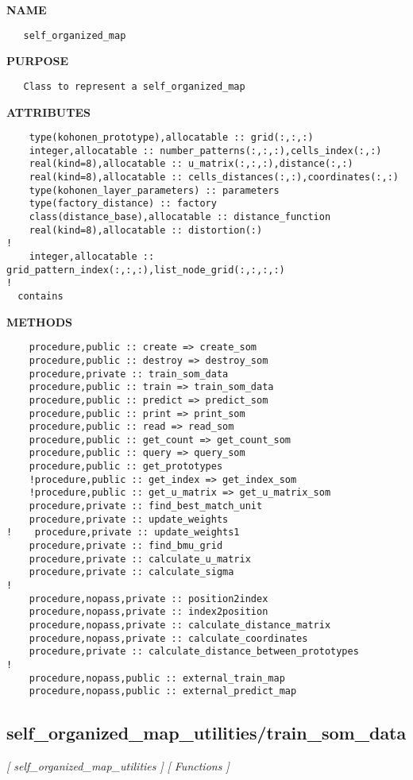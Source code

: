 \documentclass{article}
\begin{document}
\label{ch:robo54}
\label{ch:self_organized_map_utilities_self_organized_map}
\textbf{NAME}
\begin{verbatim}
   self_organized_map
\end{verbatim}
\textbf{PURPOSE}
\begin{verbatim}
   Class to represent a self_organized_map
\end{verbatim}
\textbf{ATTRIBUTES}
\begin{verbatim}
    type(kohonen_prototype),allocatable :: grid(:,:,:)
    integer,allocatable :: number_patterns(:,:,:),cells_index(:,:)
    real(kind=8),allocatable :: u_matrix(:,:,:),distance(:,:)
    real(kind=8),allocatable :: cells_distances(:,:),coordinates(:,:)
    type(kohonen_layer_parameters) :: parameters
    type(factory_distance) :: factory
    class(distance_base),allocatable :: distance_function
    real(kind=8),allocatable :: distortion(:)
! 
    integer,allocatable :: grid_pattern_index(:,:,:),list_node_grid(:,:,:,:)
!    
  contains
\end{verbatim}
\textbf{METHODS}
\begin{verbatim}
    procedure,public :: create => create_som
    procedure,public :: destroy => destroy_som
    procedure,private :: train_som_data
    procedure,public :: train => train_som_data 
    procedure,public :: predict => predict_som
    procedure,public :: print => print_som
    procedure,public :: read => read_som
    procedure,public :: get_count => get_count_som
    procedure,public :: query => query_som
    procedure,public :: get_prototypes
    !procedure,public :: get_index => get_index_som
    !procedure,public :: get_u_matrix => get_u_matrix_som
    procedure,private :: find_best_match_unit
    procedure,private :: update_weights
!    procedure,private :: update_weights1
    procedure,private :: find_bmu_grid
    procedure,private :: calculate_u_matrix
    procedure,private :: calculate_sigma
!
    procedure,nopass,private :: position2index
    procedure,nopass,private :: index2position
    procedure,nopass,private :: calculate_distance_matrix
    procedure,nopass,private :: calculate_coordinates
    procedure,private :: calculate_distance_between_prototypes
!    
    procedure,nopass,public :: external_train_map
    procedure,nopass,public :: external_predict_map
\end{verbatim}
\newpage
\subsection{self\_organized\_map\_utilities/train\_som\_data}
\textsl{[ self\_organized\_map\_utilities ]}
\textsl{[ Functions ]}
\end{document}
